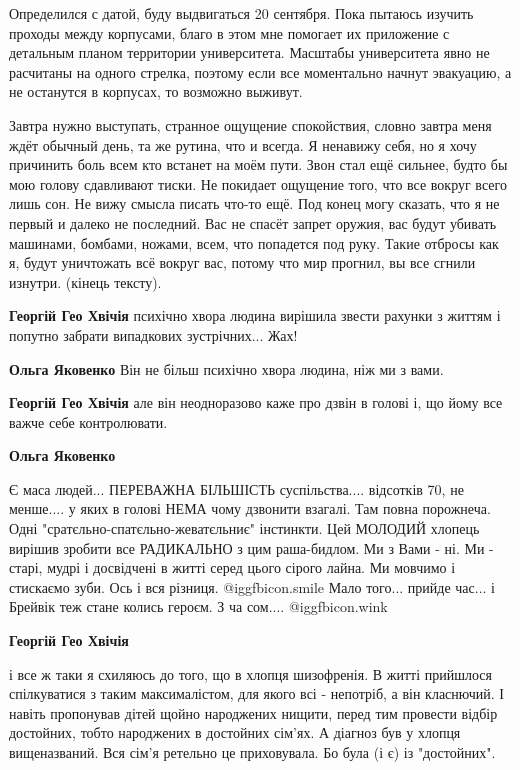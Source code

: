 \begin{itemize}
\begin{itemize}
Определился с датой, буду выдвигаться 20 сентября. Пока пытаюсь изучить проходы
между корпусами, благо в этом мне помогает их приложение с детальным планом
территории университета. Масштабы университета явно не расчитаны на одного
стрелка, поэтому если все моментально начнут эвакуацию, а не останутся в
корпусах, то возможно выживут.

Завтра нужно выступать, странное ощущение спокойствия, словно завтра меня ждёт
обычный день, та же рутина, что и всегда. Я ненавижу себя, но я хочу причинить боль
всем кто встанет на моём пути. Звон стал ещё сильнее, будто бы мою голову
сдавливают тиски. Не покидает ощущение того, что все вокруг всего лишь сон. Не
вижу смысла писать что-то ещё. Под конец могу сказать, что я не первый и далеко
не последний. Вас не спасёт запрет оружия, вас будут убивать
машинами, бомбами, ножами, всем, что попадется под руку. Такие отбросы как я, будут
уничтожать всё вокруг вас, потому что мир прогнил, вы все сгнили изнутри. (кінець
тексту).

\textbf{Георгій Гео Хвічія} психічно хвора людина вирішила звести рахунки з життям і попутно забрати випадкових зустрічних... Жах!

\textbf{Ольга Яковенко} Він не більш психічно хвора людина, ніж ми з вами.

\textbf{Георгій Гео Хвічія} але він неодноразово каже про дзвін в голові і, що йому все важче себе контролювати.

\textbf{Ольга Яковенко} 

Є маса людей... ПЕРЕВАЖНА БІЛЬШІСТЬ суспільства.... відсотків 70, не менше.... у
яких в голові НЕМА чому дзвонити взагалі. Там повна порожнеча. Одні
"сратєльно-спатєльно-жеватєльниє" інстинкти. Цей МОЛОДИЙ хлопець вирішив
зробити все РАДИКАЛЬНО з цим раша-бидлом. Ми з Вами - ні. Ми - старі, мудрі і
досвідчені в житті серед цього сірого лайна. Ми мовчимо і стискаємо зуби. Ось і
вся різниця.  @igg{fbicon.smile}  Мало того... прийде час... і Брейвік теж стане колись героєм.
З ча сом.... @igg{fbicon.wink} 

\textbf{Георгій Гео Хвічія} 

і все ж таки я схиляюсь до того, що в хлопця шизофренія. В житті прийшлося
спілкуватися з таким максималістом, для якого всі - непотріб, а він класнючий.
І навіть пропонував дітей щойно народжених нищити, перед тим провести відбір
достойних, тобто народжених в достойних сім'ях. А діагноз був у хлопця
вищеназваний. Вся сім'я ретельно це приховувала. Бо була (і є) із "достойних".



\end{itemize}
\end{itemize}
